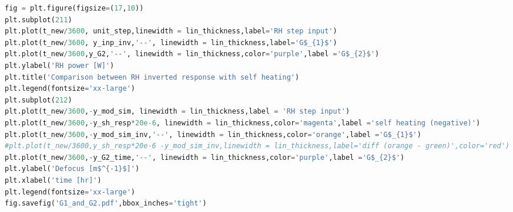 \begin{spacing}{1.2} \begin{lstlisting}[frame=single,language=Python]
fig = plt.figure(figsize=(17,10))
plt.subplot(211)
plt.plot(t_new/3600, unit_step,linewidth = lin_thickness,label='RH step input')
plt.plot(t_new/3600, y_inp_inv,'--', linewidth = lin_thickness,label='G$_{1}$')
plt.plot(t_new/3600,y_G2,'--', linewidth = lin_thickness,color='purple',label ='G$_{2}$')
plt.ylabel('RH power [W]')
plt.title('Comparison between RH inverted response with self heating')
plt.legend(fontsize='xx-large')
plt.subplot(212)
plt.plot(t_new/3600,-y_mod_sim, linewidth = lin_thickness,label = 'RH step input')
plt.plot(t_new/3600,-y_sh_resp*20e-6, linewidth = lin_thickness,color='magenta',label ='self heating (negative)')
plt.plot(t_new/3600,-y_mod_sim_inv,'--', linewidth = lin_thickness,color='orange',label ='G$_{1}$')
#plt.plot(t_new/3600,y_sh_resp*20e-6 -y_mod_sim_inv,linewidth = lin_thickness,label='diff (orange - green)',color='red')
plt.plot(t_new/3600,-y_G2_time,'--', linewidth = lin_thickness,color='purple',label ='G$_{2}$')
plt.ylabel('Defocus [m$^{-1}$]')
plt.xlabel('time [hr]')
plt.legend(fontsize='xx-large')
fig.savefig('G1_and_G2.pdf',bbox_inches='tight')
\end{lstlisting} \end{spacing}

